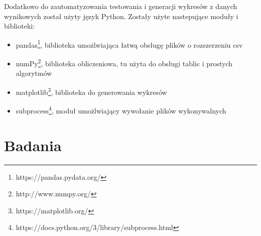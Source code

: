 \documentclass[12pt]{article}
\begin{document}
Dodatkowo do zautomatyzowania testowania i generacji wykresów z danych wynikowych został użyty język Python. Zostały użyte nastepujące moduły i biblioteki:

\begin{itemize}
	\item{pandas\footnote{https://pandas.pydata.org/}, biblioteka umożlwiająca łatwą obsługę plików o rozszerzeniu csv}
	\item{numPy\footnote{http://www.numpy.org/}, biblioteka obliczeniowa, tu użyta do obsługi tablic i prostych algorytmów} 
	\item{matplotlib\footnote{https://matplotlib.org/}, biblioteka do generowania wykresów}
	\item{subprocess\footnote{https://docs.python.org/3/library/subprocess.html}, moduł umożlwiający wywołanie plików wykonywalnych} 	
\end{itemize}


\section{Badania}
\end{document}
